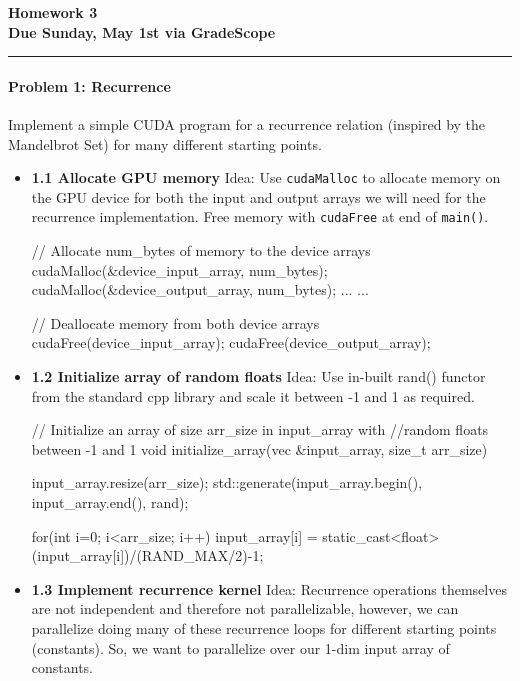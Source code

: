 \documentclass[12pt,letterpaper,twoside]{article}
\begin{document}
{\centering \textbf{Homework 3\\ Due Sunday, May 1st via GradeScope\\}}
\vspace*{-8pt}\noindent\rule{\linewidth}{1pt}

\paragraph{Problem 1: Recurrence } Implement a simple CUDA program for 
a recurrence relation (inspired by the Mandelbrot Set) for many 
different starting points.

\begin{itemize}
    \item \textbf{1.1 Allocate GPU memory} Idea: Use \texttt{cudaMalloc}
    to allocate memory on the GPU device for both the input and output 
    arrays we will need for the recurrence implementation. Free memory 
    with \texttt{cudaFree} at end of \texttt{main()}.

    \begin{cpp}
        // Allocate num_bytes of memory to the device arrays
        cudaMalloc(&device_input_array, num_bytes);
        cudaMalloc(&device_output_array, num_bytes);
        ...
        ...

        // Deallocate memory from both device arrays
        cudaFree(device_input_array);
        cudaFree(device_output_array);
    \end{cpp}

    \item \textbf{1.2 Initialize array of random floats} Idea: Use in-built
    rand() functor from the standard cpp library and scale it between -1 
    and 1 as required.

    \begin{cpp}
        // Initialize an array of size arr_size in input_array with 
        //random floats between -1 and 1
        void initialize_array(vec &input_array, size_t arr_size) {
          input_array.resize(arr_size);
          std::generate(input_array.begin(), input_array.end(), rand);
        
          for(int i=0; i<arr_size; i++){
            input_array[i] = static_cast<float>(input_array[i])/(RAND_MAX/2)-1;
          }    
        }
    \end{cpp}

    \item \textbf{1.3 Implement recurrence kernel} Idea: Recurrence operations 
    themselves are not independent and therefore not parallelizable, however, 
    we can parallelize doing many of these recurrence loops for different 
    starting points (constants). So, we want to parallelize over our 1-dim 
    input array of constants.


\end{itemize}
\end{document}
